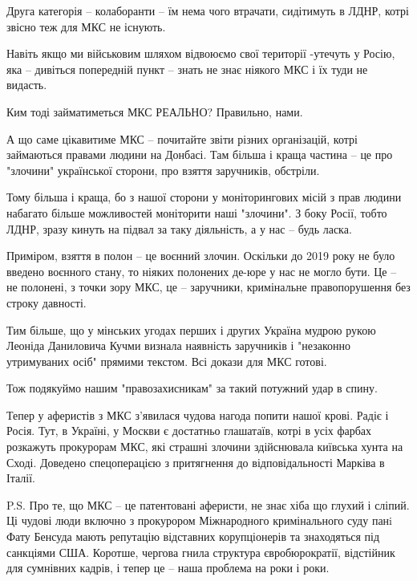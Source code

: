 Друга категорія – колаборанти – їм нема чого втрачати, сидітимуть в ЛДНР, котрі
звісно теж для МКС не існують.

Навіть якщо ми військовим шляхом відвоюємо свої території -утечуть у Росію, яка
– дивіться попередній пункт – знать не знає ніякого МКС і їх туди не видасть.

Ким тоді займатиметься МКС РЕАЛЬНО? Правильно, нами.

А що саме цікавитиме МКС – почитайте звіти різних організацій, котрі займаються
правами людини на Донбасі. Там більша і краща частина – це про "злочини"
української сторони, про взяття заручників, обстріли.

Тому більша і краща, бо з нашої сторони у моніторингових місій з прав людини
набагато більше можливостей моніторити наші "злочини". З боку Росії, тобто
ЛДНР, зразу кинуть на підвал за таку діяльність, а у нас – будь ласка.

Приміром, взяття в полон – це воєнний злочин. Оскільки до 2019 року не було
введено воєнного стану, то ніяких полонених де-юре у нас не могло бути. Це – не
полонені, з точки зору МКС, це – заручники, кримінальне правопорушення без
строку давності.

Тим більше, що у мінських угодах перших і других Україна мудрою рукою Леоніда
Даниловича Кучми визнала наявність заручників і "незаконно утримуваних осіб"
прямими текстом. Всі докази для МКС готові.

Тож подякуймо нашим "правозахисникам" за такий потужний удар в спину.

Тепер у аферистів з МКС з'явилася чудова нагода попити нашої крові. Радіє і
Росія. Тут, в Україні, у Москви є достатньо глашатаїв, котрі в усіх фарбах
розкажуть прокурорам МКС, які страшні злочини здійснювала київська хунта на
Сході. Доведено спецоперацією з притягнення до відповідальності Марківа в
Італії.

P.S. Про те, що МКС – це патентовані аферисти, не знає хіба що глухий і сліпий.
Ці чудові люди включно з прокурором Міжнародного кримінального суду панi Фату
Бенсуда мають репутацію відставних корупціонерів та знаходяться під санкціями
США. Коротше, чергова гнила структура євробюрократії, відстійник для сумнівних
кадрів, і тепер це – наша проблема на роки і роки.
